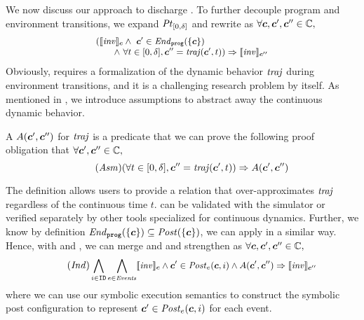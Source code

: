 We now discuss our approach to discharge .
To further decouple program and environment transitions,
we expand $\mathit{Pt}_{[0,\delta]}$  and rewrite  as $\forall \mathit{\boldsymbol{c}}, \mathit{\boldsymbol{c}}', \mathit{\boldsymbol{c}}'' \in \mathbb{C},$
\begin{equation}\label{po:ind-hyp-traj}
\small
\begin{array}{l}
(\llbracket\mathit{inv}\rrbracket_{\mathit{\boldsymbol{c}}} \land\ \mathit{\boldsymbol{c}}' \in \mathit{End}_{\mathtt{prog}}(\left\{\mathit{\boldsymbol{c}}\right\})\\
\qquad  \land\ \forall t \in [0, \delta], \mathit{\boldsymbol{c}}'' = \mathit{traj}(\mathit{\boldsymbol{c}}', t)) \Rightarrow \llbracket\mathit{inv}\rrbracket_{\mathit{\boldsymbol{c}}''}
\end{array}
\end{equation}
Obviously,  requires a formalization of the dynamic behavior $\mathit{traj}$ during environment transitions,
and it is a challenging research problem by itself.
As mentioned in ,
we introduce assumptions to abstract away the continuous dynamic behavior.
\begin{definition}
A \emph{\portasum} $A(\mathit{\boldsymbol{c}}', \mathit{\boldsymbol{c}}'')$ for $\mathit{traj}$ is a predicate that
we can prove the following proof obligation that $\forall \mathit{\boldsymbol{c}}', \mathit{\boldsymbol{c}}'' \in \mathbb{C},$
\begin{equation}\label{po:port-asm}\tag{\textit{Asm}}
(\forall t \in [0,\delta], \gconfig'' = \traj(\gconfig', t)) \Rightarrow A(\gconfig', \gconfig'')
\end{equation}
\end{definition}
The definition allows users to provide a relation that over-approximates $\mathit{traj}$ regardless of the continuous time $t$.
 can be validated with the \toolname simulator or verified separately by other tools specialized for continuous dynamics.
Further, we know by definition $\mathit{End}_{\mathtt{prog}}(\left\{\mathit{\boldsymbol{c}}\right\}) \subseteq \mathit{Post}(\left\{\mathit{\boldsymbol{c}}\right\})$,
we can apply  in a similar way.
Hence, with  and ,
we can merge  and  and strengthen as
$\forall \mathit{\boldsymbol{c}}, \mathit{\boldsymbol{c}}', \mathit{\boldsymbol{c}}'' \in \mathbb{C},$
\begin{equation}\label{po:ind}\tag{\textit{Ind}}
\small
\bigwedge_{i\in \UINS} \bigwedge_{\Ev \in \Event} \eec{\Inv}{\gconfig} \land \gconfig' \in \Post_\Ev(\gconfig, i)
\land A(\gconfig', \gconfig'')
\Rightarrow \eec{\Inv}{\gconfig''}
\end{equation}
where we can use our \K symbolic execution semantics to construct the symbolic post configuration
to represent $\mathit{\boldsymbol{c}}' \in \mathit{Post}_e(\mathit{\boldsymbol{c}}, i)$ for each event.

